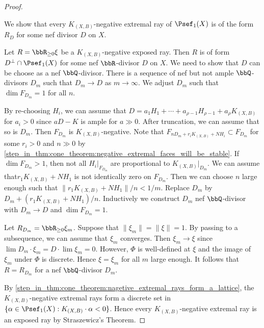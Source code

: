 \begin{proof}
        \begin{step}\label{step_in_thm:cone_theorem:negative_extremal_rays_are_rational}
            We show that every \(K_{(X,B)}\)-negative extremal ray of \(\Psef_1(X)\) is of the form \(R_D\) for some nef divisor \(D\) on \(X\).
        \end{step}
        Let \(R = \bbR_{\geq 0}\xi\) be a \(K_{(X,B)}\)-negative exposed ray.
        Then \(R\) is of form \(D^\perp \cap \Psef_1(X)\) for some nef \(\bbR\)-divisor \(D\) on \(X\).
        We need to show that \(D\) can be choose as a nef \(\bbQ\)-divisor.
        There is a sequence of nef but not ample \(\bbQ\)-divisors \(D_m\) such that \(D_m \to D\) as \(m \to \infty\).
        We adjust \(D_m\) such that \(\dim F_{D_m} = 1\) for all \(n\).

        By re-choosing \(H_i\), we can assume that \(D = a_1H_1 + \cdots + a_{\rho-1}H_{\rho-1} + a_\rho K_{(X,B)}\) for \(a_i > 0\) since \(aD-K\) is ample for \(a \gg 0\).
        After truncation, we can assume that so is \(D_m\).
        Then \(F_{D_m}\) is \(K_{(X,B)}\)-negative.
        Note that \(F_{nD_m+r_iK_{(X,B)} + N H_i} \subset F_{D_m}\) for some \(r_i>0\) and \(n\gg 0\) by \cref{step_in_thm:cone_theorem:negative_extremal_faces_will_be_stable}.
        If \(\dim F_{D_m} > 1\), then not all \(H_i|_{F_{D_m}}\) are proportional to \(K_{(X,B)}|_{D_m}\).
        We can assume that\(r_1K_{(X,B)}+N H_1\) is not identically zero on \(F_{D_m}\).
        Then we can choose \(n\) large enough such that \(\|r_1K_{(X,B)}+N H_1\|/n < 1/m\).
        Replace \(D_m\) by \(D_m + (r_1K_{(X,B)}+N H_1)/n\).
        Inductively we construct \(D_m\) nef \(\bbQ\)-divisor with \(D_m \to D\) and \(\dim F_{D_m} = 1\).

        Let \(R_{D_m} = \bbR_{\geq 0} \xi_m\).
        Suppose that \(\|\xi_m\|=\|\xi\| = 1\).
        By passing to a subsequence, we can assume that \(\xi_m\) converges.
        Then \(\xi_m \to \xi\) since \(\lim D_m \cdot \xi_m = D \cdot \lim \xi_m = 0\).
        However, \(\Phi\) is well-defined at \(\xi\) and the image of \(\xi_m\) under \(\Phi\) is discrete.
        Hence \(\xi=\xi_m\) for all \(m\) large enough.
        It follows that \(R = R_{D_m}\) for a nef \(\bbQ\)-divisor \(D_m\).

        By \cref{step_in_thm:cone_theorem:nagetive_extremal_rays_form_a_lattice}, the \(K_{(X,B)}\)-negative extremal rays form a discrete set in \(\{\alpha \in \Psef_1(X): K_{(X,B)}\cdot \alpha < 0\}\).
        Hence every \(K_{(X,B)}\)-negative extremal ray is an exposed ray by Straszewicz's Theorem.


\end{proof}
